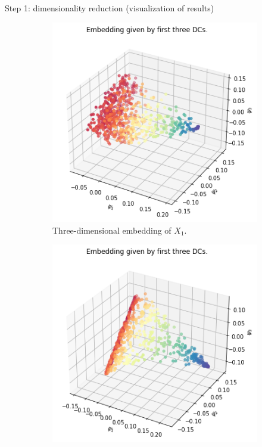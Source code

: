 \documentclass[xcolor={dvipsnames,svgnames}]{beamer}
\begin{document}
    \begin{frame}{Step 1: dimensionality reduction (visualization of results)}
\begin{figure}[H]
\centering
\begin{subfigure}[b]{0.3\textwidth}
    \includegraphics[width=\textwidth]{figures/X1_embedding.png}
    \caption{Three-dimensional embedding of $X_1$.}
\end{subfigure}
\hfill
\begin{subfigure}[b]{0.3\textwidth}
    \includegraphics[width=\textwidth]{figures/X2_embedding.png}

\end{subfigure}
\end{figure}
\end{frame}
\end{document}
